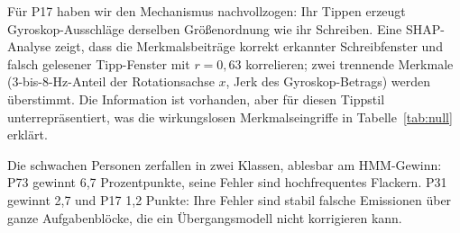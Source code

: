 Für P17 haben wir den Mechanismus nachvollzogen: Ihr Tippen erzeugt
Gyroskop-Ausschläge derselben Größenordnung wie ihr Schreiben. Eine
SHAP-Analyse \citep{lundberg2017} zeigt, dass die Merkmalsbeiträge korrekt
erkannter Schreibfenster und falsch gelesener Tipp-Fenster mit $r = 0{,}63$
korrelieren; zwei trennende Merkmale (3-bis-8-Hz-Anteil der Rotationsachse
$x$, Jerk des Gyroskop-Betrags) werden überstimmt. Die Information ist
vorhanden, aber für diesen Tippstil unterrepräsentiert, was die wirkungslosen
Merkmalseingriffe in Tabelle~\ref{tab:null} erklärt.

Die schwachen Personen zerfallen in zwei Klassen, ablesbar am HMM-Gewinn:
P73 gewinnt 6,7 Prozentpunkte, seine Fehler sind hochfrequentes Flackern.
P31 gewinnt 2,7 und P17 1,2 Punkte: Ihre Fehler sind stabil falsche
Emissionen über ganze Aufgabenblöcke, die ein Übergangsmodell nicht
korrigieren kann.
